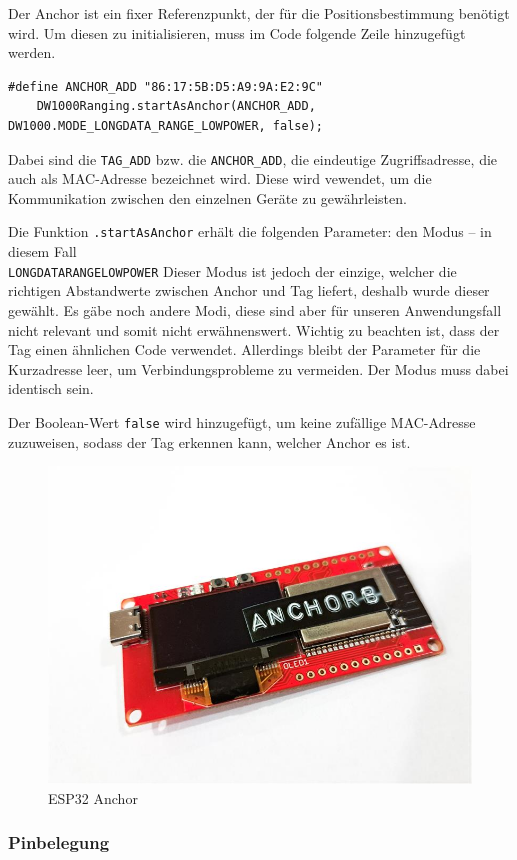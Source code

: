 Der Anchor ist ein fixer Referenzpunkt, der für die Positionsbestimmung benötigt wird. Um diesen zu initialisieren, muss im Code folgende Zeile hinzugefügt werden.
\begin{lstlisting}[style=C++, caption=Anchor Initialisierung, captionpos=b]
	#define ANCHOR_ADD "86:17:5B:D5:A9:9A:E2:9C"
	DW1000Ranging.startAsAnchor(ANCHOR_ADD, DW1000.MODE_LONGDATA_RANGE_LOWPOWER, false);
\end{lstlisting} 

Dabei sind die \texttt{TAG\_ADD} bzw. die \texttt{ANCHOR\_ADD}, die eindeutige Zugriffsadresse, die auch als MAC-Adresse bezeichnet wird. Diese wird vewendet, um die Kommunikation zwischen den einzelnen Geräte zu gewährleisten.

Die Funktion \texttt{.startAsAnchor} erhält die folgenden Parameter: den Modus – in diesem Fall \\ \texttt{LONGDATA\textunderscore RANGE\textunderscore LOWPOWER} Dieser Modus ist jedoch der einzige, welcher die richtigen Abstandwerte zwischen Anchor und Tag liefert, deshalb wurde dieser gewählt. Es gäbe noch andere Modi, diese sind aber für unseren Anwendungsfall nicht relevant und somit nicht erwähnenswert. Wichtig zu beachten ist, dass der Tag einen ähnlichen Code verwendet. Allerdings bleibt der Parameter für die Kurzadresse leer, um Verbindungsprobleme zu vermeiden. Der Modus muss dabei identisch sein.

Der Boolean-Wert \texttt{false} wird hinzugefügt, um  keine zufällige MAC-Adresse zuzuweisen, sodass der Tag erkennen kann, welcher Anchor es ist.

\begin{figure}[H]
	\centering
	\includegraphics[width=0.5\linewidth]{images/Anchor.jpg}
	\caption[ESP32 Anchor]{ESP32 Anchor}
	\label{fig:ESP32-Anchor}
\end{figure}


\newpage
\subsubsection{Pinbelegung}

